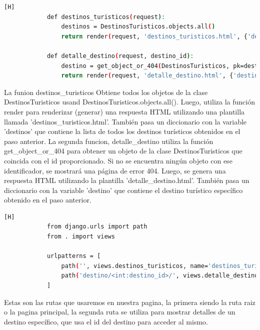 \documentclass{article}
\begin{document}
        \begin{lstlisting}[language=bash,caption={views.py}][H]
            def destinos_turisticos(request):
                destinos = DestinosTuristicos.objects.all()
                return render(request, 'destinos_turisticos.html', {'destinos': destinos})
            
            def detalle_destino(request, destino_id):
                destino = get_object_or_404(DestinosTuristicos, pk=destino_id)
                return render(request, 'detalle_destino.html', {'destino': destino})
	\end{lstlisting}
    La funion destinos\_turisticos Obtiene todos los objetos de la clase DestinosTuristicos usand DestinosTuristicos.objects.all(). Luego, utiliza la función render para renderizar (generar) una respuesta HTML utilizando una plantilla llamada 'destinos\_turisticos.html'. También pasa un diccionario con la variable 'destinos' que contiene la lista de todos los destinos turísticos obtenidos en el paso anterior.
    La segunda funcion, detalle\_destino utiliza la función get\_object\_or\_404 para obtener un objeto de la clase DestinosTuristicos que coincida con el id proporcionado. Si no se encuentra ningún objeto con ese identificador, se mostrará una página de error 404. Luego, se genera una respuesta HTML utilizando la plantilla 'detalle\_destino.html'. También pasa un diccionario con la variable 'destino' que contiene el destino turístico específico obtenido en el paso anterior.
        
        \begin{lstlisting}[language=bash,caption={urls.py}][H] 
            from django.urls import path
            from . import views
            
            urlpatterns = [
                path('', views.destinos_turisticos, name='destinos_turisticos'),
                path('destino/<int:destino_id>/', views.detalle_destino, name='detalle_destino'),
            ]
	\end{lstlisting}
    Estas son las rutas que usaremos en nuestra pagina, la primera siendo la ruta raiz o la pagina principal, la segunda ruta se utiliza para mostrar detalles de un destino específico, que usa el id del destino para acceder al mismo.
\end{document}
